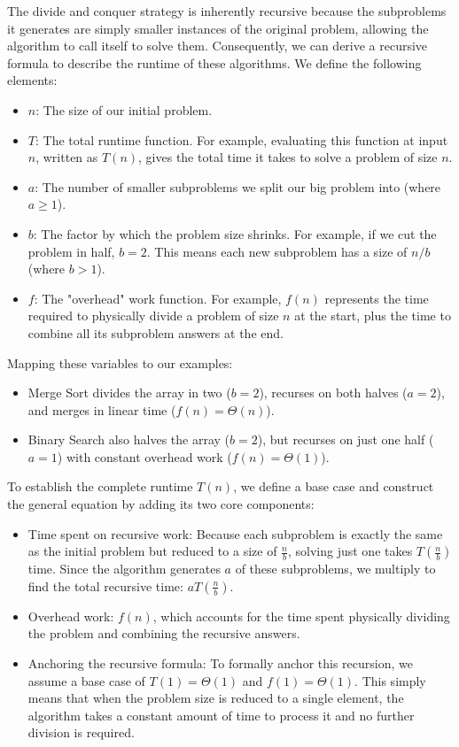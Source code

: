 \documentclass[11pt, a4paper]{article}
\begin{document}
The divide and conquer strategy is inherently recursive because the subproblems it generates are simply smaller instances of the original problem, allowing the algorithm to call itself to solve them. Consequently, we can derive a recursive formula to describe the runtime of these algorithms. We define the following elements:
\begin{itemize}
    \item $n$: The size of our initial problem.
    \item $T$: The total runtime function. For example, evaluating this function at input $n$, written as $T(n)$, gives the total time it takes to solve a problem of size $n$.
    \item $a$: The number of smaller subproblems we split our big problem into (where $a \ge 1$).
    \item $b$: The factor by which the problem size shrinks. For example, if we cut the problem in half, $b = 2$. This means each new subproblem has a size of $n/b$ (where $b > 1$).
    \item $f$: The "overhead" work function. For example, $f(n)$ represents the time required to physically divide a problem of size $n$ at the start, plus the time to combine all its subproblem answers at the end.
\end{itemize}

Mapping these variables to our examples:
\begin{itemize}
    \item Merge Sort divides the array in two ($b=2$), recurses on both halves ($a=2$), and merges in linear time ($f(n) = \Theta(n)$).

    \item  Binary Search also halves the array ($b=2$), but recurses on just one half ($a=1$) with constant overhead work ($f(n) = \Theta(1)$).
\end{itemize}


To establish the complete runtime $T(n)$, we define a base case and construct the general equation by adding its two core components:

\begin{itemize}
    \item Time spent on recursive work: Because each subproblem is exactly the same as the initial problem but reduced to a size of $\frac{n}{b}$, solving just one takes $T\left(\frac{n}{b}\right)$ time. Since the algorithm generates $a$ of these subproblems, we multiply to find the total recursive time: $aT\left(\frac{n}{b}\right)$.

    \item Overhead work: $f(n)$, which accounts for the time spent physically dividing the problem and combining the recursive answers. 

    \item Anchoring the recursive formula: To formally anchor this recursion, we assume a base case of $T(1) = \Theta(1)$ and $f(1) = \Theta(1)$. This simply means that when the problem size is reduced to a single element, the algorithm takes a constant amount of time to process it and no further division is required.
\end{itemize}
\end{document}
